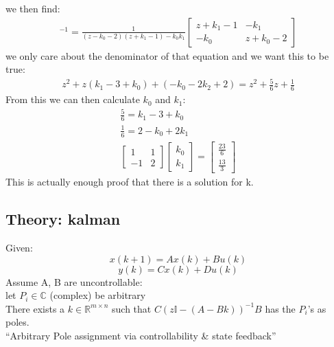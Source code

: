 \documentclass[a4paper,11pt]{article}
\begin{document}
		we then find:
		\begin{gather}
			[z\mathbb{I}-(A-Bk)]^{-1}=\frac{1}{(z-k_0-2)(z+k_1-1)-k_0k_1}
			\begin{bmatrix}
				z+k_1-1 & -k_1\\
				-k_0 & z+k_0-2
			\end{bmatrix}
		\end{gather}
		we only care about the denominator of that equation and we want this to be true:
		\begin{gather}
			z^2+z(k_1-3+k_0)+(-k_0-2k_2+2)= z^2+\frac{5}{6} z +\frac{1}{6}
		\end{gather}
		From this we can then calculate $k_0$ and $k_1$:
		\begin{gather}
			\frac{5}{6}=k_1-3+k_0\\
			\frac{1}{6}=2-k_0+2k_1\\
			\begin{bmatrix}
				1 &1 \\
				-1 &2 
			\end{bmatrix} 
			\begin{bmatrix}
				 k_0 \\ k_1
			\end{bmatrix}
			= 
			\begin{bmatrix}
				\frac{23}{6}\\
				\frac{13}{3}
			\end{bmatrix} 
		\end{gather}
		This is actually enough proof that there is a solution for k.\\
		\subsection{Theory: kalman}
		Given:
		\begin{equation}
			x(k+1) = A x(k) + Bu(k)
		\end{equation}
		\begin{equation}
			y(k) = C x(k) + Du(k)
		\end{equation}
		Assume A, B are uncontrollable:\\
		let $P_i \in \mathbb C$ (complex) be arbitrary\\
		There exists a $k \in \mathbb R^{m\times n}$ such that $C(z\mathbb I - (A-Bk))^{-1}B$ has the $P_i$'s as poles.\\
		``Arbitrary Pole assignment via controllability \& state feedback''
\end{document}
